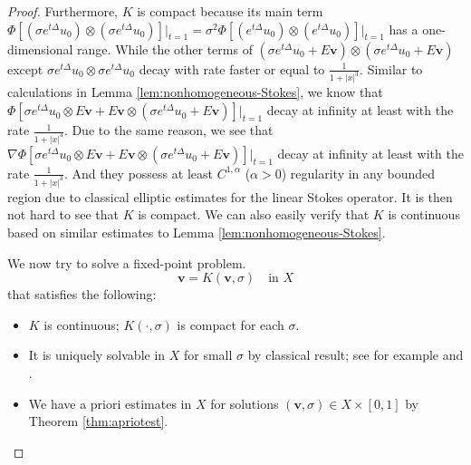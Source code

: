 \documentclass[12pt]{amsart}
\numberwithin{equation}{section}              %
\theoremstyle{remark}
\newcommand{\Bv}{{\boldsymbol{v}}}
\begin{document}
\begin{proof}
			Furthermore, $K$ is compact because its main term $\Phi[(\sigma e^{t\Delta}u_0 ) \otimes (\sigma e^{t\Delta}u_0 )] \big|_{t=1} = \sigma^2 \Phi[( e^{t\Delta}u_0 ) \otimes ( e^{t\Delta}u_0 )] \big|_{t=1}$ has a one-dimensional range. While the other terms of 
            $(\sigma e^{t\Delta}u_0 + E\Bv) \otimes (\sigma e^{t\Delta}u_0 + E\Bv)$ except $\sigma e^{t\Delta}u_0  \otimes \sigma e^{t\Delta}u_0$ decay with rate faster or equal to $\frac{1}{1+|x|^3}$. Similar to calculations in Lemma \ref{lem:nonhomogeneous-Stokes}, we know that 
            $\Phi[\sigma e^{t\Delta}u_0  \otimes  E\Bv + E\Bv\otimes (\sigma e^{t\Delta}u_0 + E\Bv)] \big|_{t=1}$ decay at infinity at least with the rate $\frac{1}{1+|x|^3}$. 
            Due to the same reason, we see that $\nabla \Phi[\sigma e^{t\Delta}u_0  \otimes  E\Bv + E\Bv\otimes (\sigma e^{t\Delta}u_0 + E\Bv)] \big|_{t=1}$ decay at infinity at least with the rate $\frac{1}{1+|x|^3}$. 
           And they possess at least $C^{1,\alpha}$ ($\alpha>0$) regularity in  any bounded region due to classical elliptic estimates for the linear Stokes operator. It is then not hard to see that $K$ is compact.
			We can also easily verify that
$K$ is continuous   based on similar  estimates to Lemma \ref{lem:nonhomogeneous-Stokes}.

			We now try to solve a fixed-point problem.
			\begin{equation}\label{eq:fixedpoint}
				\Bv = K(\Bv, \sigma) \quad \text{in } X
			\end{equation}
			that satisfies the following:
			\begin{itemize}
				\item[(1)] $K$ is continuous; $K(\cdot, \sigma)$ is compact for each $\sigma$.
				\item[(2)] It is uniquely solvable in $X$ for small $\sigma$ by classical result; see for example \cite{Cannone96} and \cite[Proposition 3]{Brandolese09}.
				\item[(3)] We have a priori estimates in $X$ for solutions $(\Bv, \sigma) \in X \times [0, 1]$ by Theorem \ref{thm:apriotest}.
			\end{itemize}
			

\end{proof}
\end{document}
